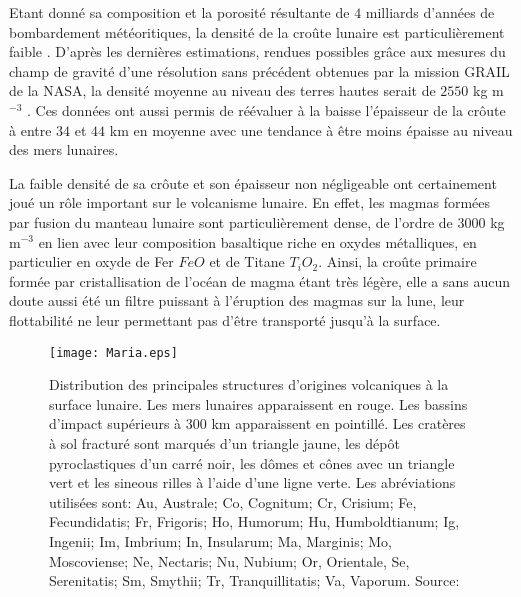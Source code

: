 Etant donné sa composition et  la porosité résultante de $4$ milliards
d'années  de  bombardement  météoritiques,  la densité  de  la  croûte
lunaire  est particulièrement  faible \citep{Huang:2012gf,Han:2014ic}.
D'après les dernières estimations, rendues possibles grâce aux mesures
du champ  de gravité d'une  résolution sans précédent obtenues  par la
mission GRAIL  de la  NASA, la  densité moyenne  au niveau  des terres
hautes serait  de $2550$  kg m$^{-3}$  \citep{Wieczorek:2013ipa}.  Ces
données ont  aussi permis de réévaluer  à la baisse l'épaisseur  de la
crôute à  entre $34$ et  $44$ km en moyenne  avec une tendance  à être
moins épaisse au niveau des mers lunaires.

La faible  densité de sa crôute  et son épaisseur non  négligeable ont
certainement joué  un rôle  important sur  le volcanisme  lunaire.  En
effet,  les  magmas  formées  par   fusion  du  manteau  lunaire  sont
particulièrement   dense,   de   l'ordre   de   $3000$   kg   m$^{-3}$
\citep{Kiefer:2012kp} en  lien avec leur composition  basaltique riche
en oxydes  métalliques, en  particulier en  oxyde de  Fer $FeO$  et de
Titane $T_iO_2$. Ainsi, la  croûte primaire formée par cristallisation
de l'océan de  magma étant très légère, elle a  sans aucun doute aussi
été  un filtre  puissant à  l'éruption des  magmas sur  la lune,  leur
flottabilité  ne  leur permettant  pas  d'être  transporté jusqu'à  la
surface.

\begin{figure}[h!]
  \begin{center}
    \graphicspath{ {/Users/thorey/Documents/These/Manuscript/Figure/Chapter1/} }
    \texttt{[image: Maria.eps]}
    \caption{Distribution   des   principales  structures   d'origines
      volcaniques   à  la   surface   lunaire.    Les  mers   lunaires
      apparaissent en  rouge. Les bassins d'impact  supérieurs à $300$
      km apparaissent en pointillé.  Les  cratères à sol fracturé sont
      marqués d'un triangle jaune, les dépôt pyroclastiques d'un carré
      noir, les  dômes et cônes avec  un triangle vert et  les sineous
      rilles à  l'aide d'une  ligne verte. Les  abréviations utilisées
      sont: Au, Australe; Co, Cognitum; Cr, Crisium; Fe, Fecundidatis;
      Fr, Frigoris;  Ho, Humorum; Hu, Humboldtianum;  Ig, Ingenii; Im,
      Imbrium;  In,  Insularum;  Ma, Marginis;  Mo,  Moscoviense;  Ne,
      Nectaris;  Nu,  Nubium;  Or,  Orientale,  Se,  Serenitatis;  Sm,
      Smythii;    Tr,    Tranquillitatis;   Va,    Vaporum.    Source:
      \citet{Platz:2015ex}}
    \label{C1-picture}
  \end{center}
\end{figure}

